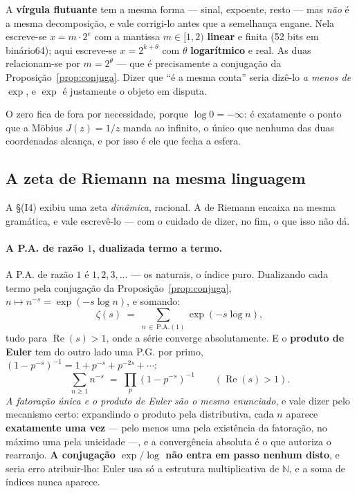\documentclass[11pt,a4paper]{article}
\theoremstyle{plain}
\theoremstyle{definition}
\theoremstyle{remark}
\newcommand{\N}{\mathbb{N}}
\begin{document}
A \textbf{vírgula flutuante} tem a mesma forma --- sinal, expoente, resto --- mas \emph{não} é a
mesma decomposição, e vale corrigi-lo antes que a semelhança engane. Nela escreve-se $x = m\cdot2^e$
com a mantissa $m\in[1,2)$ \textbf{linear} e finita (52 bits em binário64); aqui escreve-se
$x = 2^{k+\theta}$ com $\theta$ \textbf{logarítmico} e real. As duas relacionam-se por
$m = 2^{\theta}$ --- que é precisamente a conjugação da Proposição~\ref{prop:conjuga}. Dizer que
``é a mesma conta'' seria dizê-lo \emph{a menos de $\exp$}, e $\exp$ é justamente o objeto em
disputa.

O zero fica de fora por necessidade, porque $\log 0 = -\infty$: é exatamente o ponto que a Möbius
$J(z)=1/z$ manda ao infinito, o único que nenhuma das duas coordenadas alcança, e por isso é ele
que fecha a esfera.


\subsection{A zeta de Riemann na mesma linguagem}\label{sec:zetariemann}

A \S(I4) exibiu uma zeta \emph{dinâmica}, racional. A de Riemann encaixa na mesma
gramática, e vale escrevê-lo --- com o cuidado de dizer, no fim, o que isso não dá.

\paragraph{A P.A. de razão $1$, dualizada termo a termo.} A P.A. de razão $1$ é $1,2,3,\dots$ ---
os naturais, o índice puro. Dualizando cada termo pela conjugação da Proposição~\ref{prop:conjuga},
$n \mapsto n^{-s} = \exp(-s\log n)$, e somando:
\[
  \zeta(s) \;=\; \sum_{n\,\in\,\mathrm{P.A.}(1)} \exp(-s\log n) ,
\]
tudo para $\operatorname{Re}(s) > 1$, onde a série converge absolutamente. E o \textbf{produto de
Euler} tem do outro lado uma P.G. por primo, $(1-p^{-s})^{-1} = 1 + p^{-s} + p^{-2s} + \cdots$:
\[
  \sum_{n\geq1} n^{-s} \;=\; \prod_p (1-p^{-s})^{-1} \qquad (\operatorname{Re}(s)>1) .
\]
\emph{A fatoração única e o produto de Euler são o mesmo enunciado}, e vale dizer pelo mecanismo
certo: expandindo o produto pela distributiva, cada $n$ aparece \textbf{exatamente uma vez} ---
pelo menos uma pela existência da fatoração, no máximo uma pela unicidade ---, e a convergência
absoluta é o que autoriza o rearranjo. \textbf{A conjugação $\exp/\log$ não entra em passo nenhum
disto}, e seria erro atribuir-lho: Euler usa só a estrutura multiplicativa de $\N$, e a soma de
índices nunca aparece.
\end{document}

